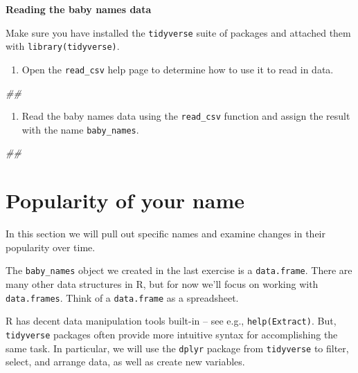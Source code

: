 \documentclass[]{book}
\newenvironment{Shaded}{\begin{snugshade}}{\end{snugshade}}
\newcommand{\CommentTok}[1]{\textcolor[rgb]{0.56,0.35,0.01}{\textit{#1}}}
\providecommand{\tightlist}{%
  \setlength{\itemsep}{0pt}\setlength{\parskip}{0pt}}
\begin{document}
\textbf{Reading the baby names data}

Make sure you have installed the \texttt{tidyverse} suite of packages and attached them with \texttt{library(tidyverse)}.

\begin{enumerate}
\def\labelenumi{\arabic{enumi}.}
\tightlist
\item
  Open the \texttt{read\_csv} help page to determine how to use it to read in data.
\end{enumerate}

\begin{Shaded}
\begin{Highlighting}[]
\CommentTok{##}
\end{Highlighting}
\end{Shaded}

\begin{enumerate}
\def\labelenumi{\arabic{enumi}.}
\setcounter{enumi}{1}
\tightlist
\item
  Read the baby names data using the \texttt{read\_csv} function and assign the result
  with the name \texttt{baby\_names}.
\end{enumerate}

\begin{Shaded}
\begin{Highlighting}[]
\CommentTok{##}
\end{Highlighting}
\end{Shaded}

\hypertarget{popularity-of-your-name}{%
\section{Popularity of your name}\label{popularity-of-your-name}}

In this section we will pull out specific names and examine changes in
their popularity over time.

The \texttt{baby\_names} object we created in the last exercise is a \texttt{data.frame}.
There are many other data structures in R, but for now we'll focus on
working with \texttt{data.frames}. Think of a \texttt{data.frame} as a spreadsheet.

R has decent data manipulation tools built-in -- see e.g.,
\texttt{help(Extract)}. But, \texttt{tidyverse} packages often provide
more intuitive syntax for accomplishing the same task. In
particular, we will use the \texttt{dplyr} package from \texttt{tidyverse}
to filter, select, and arrange data, as well as create new variables.
\end{document}
